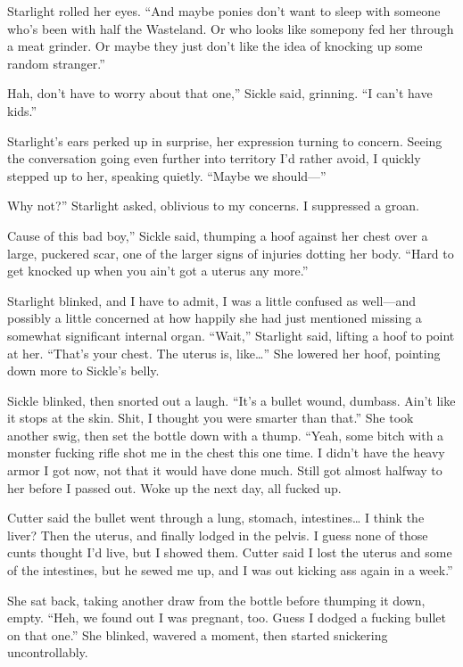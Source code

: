 Starlight rolled her eyes. “And maybe ponies don’t want to sleep with someone who’s been with half the Wasteland. Or who looks like somepony fed her through a meat grinder. Or maybe they just don’t like the idea of knocking up some random stranger.”

\leavevmode{}Hah, don’t have to worry about that one,” Sickle said, grinning. “I can’t have kids.”

Starlight’s ears perked up in surprise, her expression turning to concern. Seeing the conversation going even further into territory I’d rather avoid, I quickly stepped up to her, speaking quietly. “Maybe we should—”

\leavevmode{}Why not?” Starlight asked, oblivious to my concerns. I suppressed a groan.

\leavevmode{}Cause of this bad boy,” Sickle said, thumping a hoof against her chest over a large, puckered scar, one of the larger signs of injuries dotting her body. “Hard to get knocked up when you ain’t got a uterus any more.”

Starlight blinked, and I have to admit, I was a little confused as well—and possibly a little concerned at how happily she had just mentioned missing a somewhat significant internal organ. “Wait,” Starlight said, lifting a hoof to point at her. “That’s your chest. The uterus is, like…” She lowered her hoof, pointing down more to Sickle’s belly.

Sickle blinked, then snorted out a laugh. “It’s a bullet wound, dumbass. Ain’t like it stops at the skin. Shit, I thought you were smarter than that.” She took another swig, then set the bottle down with a thump. “Yeah, some bitch with a monster fucking rifle shot me in the chest this one time. I didn’t have the heavy armor I got now, not that it would have done much. Still got almost halfway to her before I passed out. Woke up the next day, all fucked up.

\leavevmode{}Cutter said the bullet went through a lung, stomach, intestines… I think the liver? Then the uterus, and finally lodged in the pelvis. I guess none of those cunts thought I’d live, but I showed them. Cutter said I lost the uterus and some of the intestines, but he sewed me up, and I was out kicking ass again in a week.”

She sat back, taking another draw from the bottle before thumping it down, empty. “Heh, we found out I was pregnant, too. Guess I dodged a fucking bullet on that one.” She blinked, wavered a moment, then started snickering uncontrollably.

